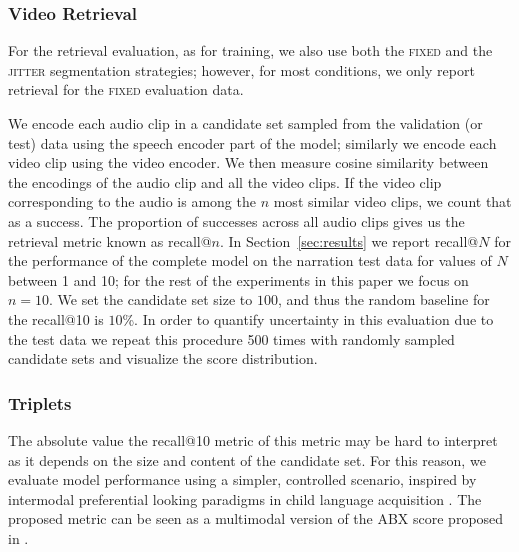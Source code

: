 \subsubsection{Video Retrieval}
\label{sec:retrieval}
For the retrieval evaluation, as for training, we also use both
the \textsc{fixed} and the \textsc{jitter} segmentation strategies;
however, for most conditions, we only report retrieval for the
\textsc{fixed} evaluation data.

We encode each audio clip in a candidate set sampled from the
validation (or test) data using the speech encoder part of the model;
similarly we encode each video clip using the video encoder. We then
measure cosine similarity between the encodings of the audio clip and
all the video clips. If the video clip corresponding to the audio is
among the $n$ most similar video clips, we count that as a
success. The proportion of successes across all audio clips gives us
the retrieval metric known as recall@$n$. In Section~\ref{sec:results} 
we report recall@$N$ for the performance of the complete model on 
the narration test data for values of $N$ between 1 and 10; for the rest
of the experiments in this paper we focus on $n=10$. 
We set the candidate set size to $100$, and thus
the random baseline for the recall@10 is $10$\%. In order to quantify
uncertainty in this evaluation due to the test data we repeat this
procedure 500 times with randomly sampled candidate sets and visualize
the score distribution.


\subsubsection{Triplets}
\label{sec:triplets}
The absolute value the recall@10 metric of this metric may be hard to
interpret as it depends on the size and content of the candidate set.
For this reason, we evaluate model performance using a simpler,
controlled scenario, inspired by intermodal preferential looking
paradigms in child language acquisition
\citep{hirsh1996intermodal}. The proposed metric can be seen as a
multimodal version of the ABX score proposed in \citet{schatz2016abx}.


